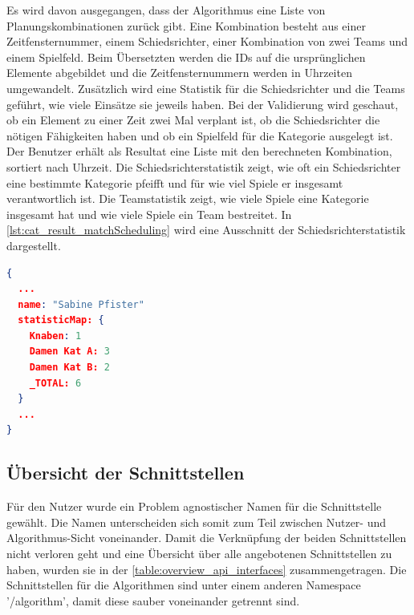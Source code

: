 Es wird davon ausgegangen, dass der Algorithmus eine Liste von Planungskombinationen zurück gibt. Eine Kombination besteht aus einer Zeitfensternummer, einem Schiedsrichter, 
einer Kombination von zwei Teams und einem Spielfeld. Beim Übersetzten werden die IDs auf die ursprünglichen Elemente abgebildet und die Zeitfensternummern werden in Uhrzeiten 
umgewandelt. Zusätzlich wird eine Statistik für die Schiedsrichter und die Teams geführt, wie viele Einsätze sie jeweils haben. Bei der Validierung wird geschaut, ob ein Element zu einer Zeit zwei 
Mal verplant ist, ob die Schiedsrichter die nötigen Fähigkeiten haben und ob ein Spielfeld für die Kategorie ausgelegt ist. Der Benutzer erhält als Resultat eine Liste mit den berechneten 
Kombination, sortiert nach Uhrzeit. Die Schiedsrichterstatistik zeigt, wie oft ein Schiedsrichter eine bestimmte Kategorie pfeifft und für wie viel Spiele er insgesamt verantwortlich ist. Die 
Teamstatistik zeigt, wie viele Spiele eine Kategorie insgesamt hat und wie viele Spiele ein Team bestreitet. In \autoref{lst:cat_result_matchScheduling} wird eine Ausschnitt der 
Schiedsrichterstatistik dargestellt.

\begin{lstlisting}[language=JSON, caption=Ausschnitt eines Resultats einer Spielplan Erstellung, label=lst:cat_result_matchScheduling]  
{
  ...
  name: "Sabine Pfister"
  statisticMap: {
    Knaben: 1
    Damen Kat A: 3
    Damen Kat B: 2
    _TOTAL: 6
  }
  ...
}
\end{lstlisting}

\subsection{Übersicht der Schnittstellen}
Für den Nutzer wurde ein Problem agnostischer Namen für die Schnittstelle gewählt. Die Namen unterscheiden sich somit zum Teil zwischen Nutzer- und Algorithmus-Sicht voneinander. Damit die 
Verknüpfung der beiden Schnittstellen nicht verloren geht und eine Übersicht über alle angebotenen Schnittstellen zu haben, wurden sie in der \autoref{table:overview_api_interfaces} 
zusammengetragen. Die Schnittstellen für die Algorithmen sind unter einem anderen Namespace '/algorithm', damit diese sauber voneinander getrennt sind.

